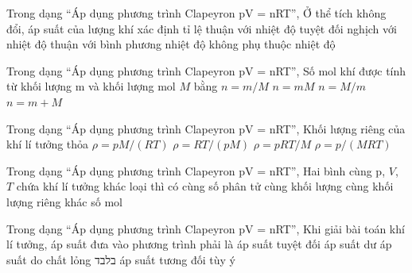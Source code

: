 \begin{ex}
Trong dạng “Áp dụng phương trình Clapeyron pV = nRT”, Ở thể tích không đổi, áp suất của lượng khí xác định tỉ lệ
\choice
{\True thuận với nhiệt độ tuyệt đối}
{nghịch với nhiệt độ}
{thuận với bình phương nhiệt độ}
{không phụ thuộc nhiệt độ}
\end{ex}

\begin{ex}
Trong dạng “Áp dụng phương trình Clapeyron pV = nRT”, Số mol khí được tính từ khối lượng m và khối lượng mol $M$ bằng
\choice
{\True $n=m/M$}
{$n=mM$}
{$n=M/m$}
{$n=m+M$}
\end{ex}

\begin{ex}
Trong dạng “Áp dụng phương trình Clapeyron pV = nRT”, Khối lượng riêng của khí lí tưởng thỏa
\choice
{\True $\rho=pM/(RT)$}
{$\rho=RT/(pM)$}
{$\rho=pRT/M$}
{$\rho=p/(MRT)$}
\end{ex}

\begin{ex}
Trong dạng “Áp dụng phương trình Clapeyron pV = nRT”, Hai bình cùng p, $V$, $T$ chứa khí lí tưởng khác loại thì có
\choice
{\True cùng số phân tử}
{cùng khối lượng}
{cùng khối lượng riêng}
{khác số mol}
\end{ex}

\begin{ex}
Trong dạng “Áp dụng phương trình Clapeyron pV = nRT”, Khi giải bài toán khí lí tưởng, áp suất đưa vào phương trình phải là
\choice
{\True áp suất tuyệt đối}
{áp suất dư}
{áp suất do chất lỏng בלבד}
{áp suất tương đối tùy ý}
\end{ex}

